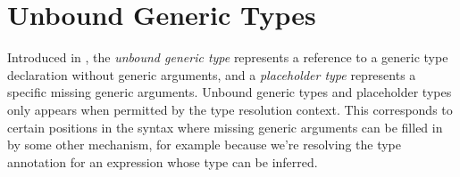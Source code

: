 \documentclass[../generics]{subfiles}
\begin{document}
\section{Unbound Generic Types}\label{unbound generic types}

Introduced in , the \emph{unbound generic type} represents a reference to a generic type declaration without generic arguments, and a \emph{placeholder type} represents a specific missing generic arguments. Unbound generic types and placeholder types only appears when permitted by the type resolution context. This corresponds to certain positions in the syntax where missing generic arguments can be filled in by some other mechanism, for example because we're resolving the type annotation for an expression whose type can be inferred.
\end{document}
